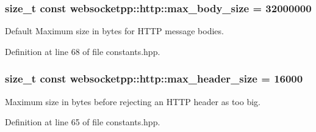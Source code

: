 \subsubsection[{max\+\_\+body\+\_\+size}]{\setlength{\rightskip}{0pt plus 5cm}size\+\_\+t const websocketpp\+::http\+::max\+\_\+body\+\_\+size = 32000000}\label{namespacewebsocketpp_1_1http_a0cc54432842e22de04c4985cba23f54f}


Default Maximum size in bytes for H\+T\+T\+P message bodies. 



Definition at line 68 of file constants.\+hpp.

\hypertarget{namespacewebsocketpp_1_1http_a514b8c48c36a9e42964f9ea35a82bc95}{}
\subsubsection[{max\+\_\+header\+\_\+size}]{\setlength{\rightskip}{0pt plus 5cm}size\+\_\+t const websocketpp\+::http\+::max\+\_\+header\+\_\+size = 16000}\label{namespacewebsocketpp_1_1http_a514b8c48c36a9e42964f9ea35a82bc95}


Maximum size in bytes before rejecting an H\+T\+T\+P header as too big. 



Definition at line 65 of file constants.\+hpp.

